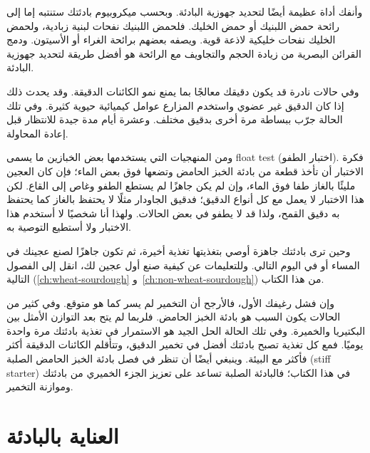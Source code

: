 وأنفك أداة عظيمة أيضًا لتحديد جهوزية البادئة. وبحسب ميكروبيوم بادئتك ستنتبه إما إلى رائحة حمض اللبنيك أو حمض الخليك. فلحمض اللبنيك نفحات لبنية زبادية، ولحمض الخليك نفحات خليكية لاذعة قوية. ويصفه بعضهم برائحة الغراء أو الأسيتون. ودمج القرائن البصرية من زيادة الحجم والتجاويف مع الرائحة هو أفضل طريقة لتحديد جهوزية البادئة.

وفي حالات نادرة قد يكون دقيقك معالجًا بما يمنع نمو الكائنات الدقيقة. وقد يحدث ذلك إذا كان الدقيق غير عضوي واستخدم المزارع عوامل كيميائية حيوية كثيرة. وفي تلك الحالة جرّب ببساطة مرة أخرى بدقيق مختلف. وعشرة أيام مدة جيدة للانتظار قبل إعادة المحاولة.

ومن المنهجيات التي يستخدمها بعض الخبازين ما يسمى \textenglish{float test} (اختبار الطفو). فكرة الاختبار أن تأخذ قطعة من بادئة الخبز الحامض وتضعها فوق بعض الماء؛ فإن كان العجين مليئًا بالغاز طفا فوق الماء، وإن لم يكن جاهزًا لم يستطع الطفو وغاص إلى القاع. لكن هذا الاختبار لا يعمل مع كل أنواع الدقيق؛ فدقيق الجاودار مثلًا لا يحتفظ بالغاز كما يحتفظ به دقيق القمح، ولذا قد لا يطفو في بعض الحالات. ولهذا أنا شخصيًا لا أستخدم هذا الاختبار ولا أستطيع التوصية به.

وحين ترى بادئتك جاهزة أوصي بتغذيتها تغذية أخيرة، ثم تكون جاهزًا لصنع عجينك في المساء أو في اليوم التالي. وللتعليمات عن كيفية صنع أول عجين لك، انقل إلى الفصول التالية (\ref{ch:wheat-sourdough} و~\ref{ch:non-wheat-sourdough}) من هذا الكتاب.

وإن فشل رغيفك الأول، فالأرجح أن التخمير لم يسر كما هو متوقع. وفي كثير من الحالات يكون السبب هو بادئة الخبز الحامض. فلربما لم يتح بعد التوازن الأمثل بين البكتيريا والخميرة. وفي تلك الحالة الحل الجيد هو الاستمرار في تغذية بادئتك مرة واحدة يوميًا. فمع كل تغذية تصبح بادئتك أفضل في تخمير الدقيق، وتتأقلم الكائنات الدقيقة أكثر فأكثر مع البيئة. وينبغي أيضًا أن تنظر في فصل بادئة الخبز الحامض الصلبة \textenglish{(stiff starter)} في هذا الكتاب؛ فالبادئة الصلبة تساعد على تعزيز الجزء الخميري من بادئتك وموازنة التخمير.

\section{العناية بالبادئة}

\begin{flowchart}[!htb]
\centering
  
  \caption[مخطط تدفق العناية بالبادئة]{مخطط تدفق كامل يريك كيف تُجري عناية سليمة ببادئة الخبز الحامض. يمكنك استخدام قطعة من عجينك كبادئة تالية. ويمكنك أيضًا استخدام البادئة المتبقية وتغذيتها مرة أخرى. واختر الخيار الأنسب لجدولك الخاص. ويفترض المخطط أنك تستخدم بادئة عند مستوى ترطيب . فاضبط محتوى الماء وفقًا لذلك عند استخدام بادئة صلبة.}%
  \label{fig:sourdough-maintenance-process}
\end{flowchart}

